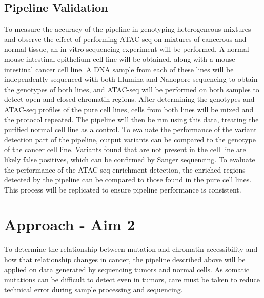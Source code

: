 



\subsection{Pipeline Validation}

To measure the accuracy of the pipeline in genotyping heterogeneous mixtures and observe the effect of performing ATAC-seq on mixtures of cancerous and normal tissue, an in-vitro sequencing experiment will be performed. A normal mouse intestinal epithelium cell line will be obtained, along with a mouse intestinal cancer cell line. A DNA sample from each of these lines will be independently sequenced with both Illumina and Nanopore sequencing to obtain the genotypes of both lines, and ATAC-seq will be performed on both samples to detect open and closed chromatin regions. After determining the genotypes and ATAC-seq profiles of the pure cell lines, cells from both lines will be mixed and the protocol repeated. The pipeline will then be run using this data, treating the purified normal cell line as a control. To evaluate the performance of the variant detection part of the pipeline, output variants can be compared to the genotype of the cancer cell line. Variants found that are not present in the cell line are likely false positives, which can be confirmed by Sanger sequencing. To evaluate the performance of the ATAC-seq enrichment detection, the enriched regions detected by the pipeline can be compared to those found in the pure cell lines.
This process will be replicated to ensure pipeline performance is consistent. 


\section{Approach - Aim 2}
To determine the relationship between mutation and chromatin accessibility and how that relationship changes in cancer, the pipeline described above will be applied on data generated by sequencing tumors and normal cells. As somatic mutations can be difficult to detect even in tumors, care must be taken to reduce technical error during sample processing and sequencing.

